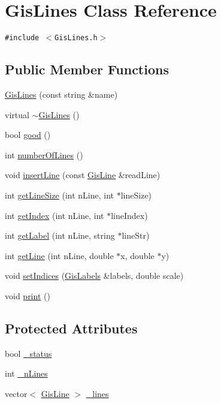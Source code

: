 \hypertarget{classGisLines}{
\section{Gis\-Lines Class Reference}
\label{classGisLines}
}
{\tt \#include $<$Gis\-Lines.h$>$}

\subsection*{Public Member Functions}
\begin{CompactItemize}
\item 
\hyperlink{classGisLines_a0}{Gis\-Lines} (const string \&name)
\item 
virtual \hyperlink{classGisLines_a1}{$\sim$Gis\-Lines} ()
\item 
bool \hyperlink{classGisLines_a2}{good} ()
\item 
int \hyperlink{classGisLines_a3}{number\-Of\-Lines} ()
\item 
void \hyperlink{classGisLines_a4}{insert\-Line} (const \hyperlink{classGisLine}{Gis\-Line} \&read\-Line)
\item 
int \hyperlink{classGisLines_a5}{get\-Line\-Size} (int n\-Line, int $\ast$line\-Size)
\item 
int \hyperlink{classGisLines_a6}{get\-Index} (int n\-Line, int $\ast$line\-Index)
\item 
int \hyperlink{classGisLines_a7}{get\-Label} (int n\-Line, string $\ast$line\-Str)
\item 
int \hyperlink{classGisLines_a8}{get\-Line} (int n\-Line, double $\ast$x, double $\ast$y)
\item 
void \hyperlink{classGisLines_a9}{set\-Indices} (\hyperlink{classGisLabels}{Gis\-Labels} \&labels, double scale)
\item 
void \hyperlink{classGisLines_a10}{print} ()
\end{CompactItemize}
\subsection*{Protected Attributes}
\begin{CompactItemize}
\item 
bool \hyperlink{classGisLines_p0}{\_\-status}
\item 
int \hyperlink{classGisLines_p1}{\_\-n\-Lines}
\item 
vector$<$ \hyperlink{classGisLine}{Gis\-Line} $>$ \hyperlink{classGisLines_p2}{\_\-lines}
\end{CompactItemize}
